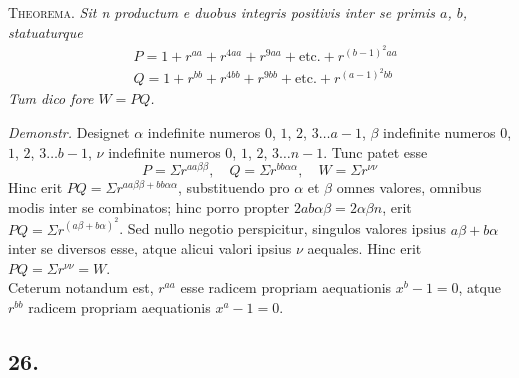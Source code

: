 \documentclass[twoside,12pt, showframe]{memoir}
\begin{document}
\textsc{Theorema.} \textit{Sit n productum e duobus integris positivis inter se primis \(a\), \(b\), statuaturque}
\[\begin{aligned}
& P=1+r^{a a}+r^{4 a a}+r^{9 a a}+\text{etc.}+r^{(b-1)^{2} a a} \\
& Q=1+r^{b b}+r^{4 b b}+r^{9 b b}+\text{etc.}+r^{(a-1)^{2} b b}
\end{aligned}\]
\textit{Tum dico fore \(W=P Q\).}
 
\textit{Demonstr.} Designet \(\alpha\) indefinite numeros \(0\), \(1\), \(2\), \(3 \ldots a-1\), \(\beta\) indefinite numeros \(0\), \(1\), \(2\), \(3 \ldots b-1\), \(\nu\) indefinite numeros \(0\), \(1\), \(2\), \(3 \ldots n-1\). Tunc patet esse
\[P=\Sigma r^{a a \beta \beta}, \quad Q=\Sigma r^{b b \alpha \alpha}, \quad W=\Sigma r^{\nu \nu}\]
Hinc erit \(P Q=\Sigma r^{a a \beta \beta +b b \alpha \alpha}\), substituendo pro \(\alpha\) et \(\beta\) omnes valores, omnibus modis inter se combinatos; hinc porro propter \(2 a b \alpha \beta =2 \alpha \beta n\), erit \(P Q=\Sigma r^{(a \beta+b \alpha)^{2}}\). Sed nullo negotio perspicitur, singulos valores ipsius \(a \beta+b \alpha\) inter se diversos esse, atque alicui valori ipsius \(\nu\) aequales. Hinc erit \(P Q=\Sigma r^{\nu \nu}=W\).\\
 
Ceterum notandum est, \(r^{a a}\) esse radicem propriam aequationis \(x^{b}-1=0\), atque \(r^{b b}\) radicem propriam aequationis \(x^{a}-1=0\).\clearpage\noindent%

\subsection*{26.}
 
\end{document}
